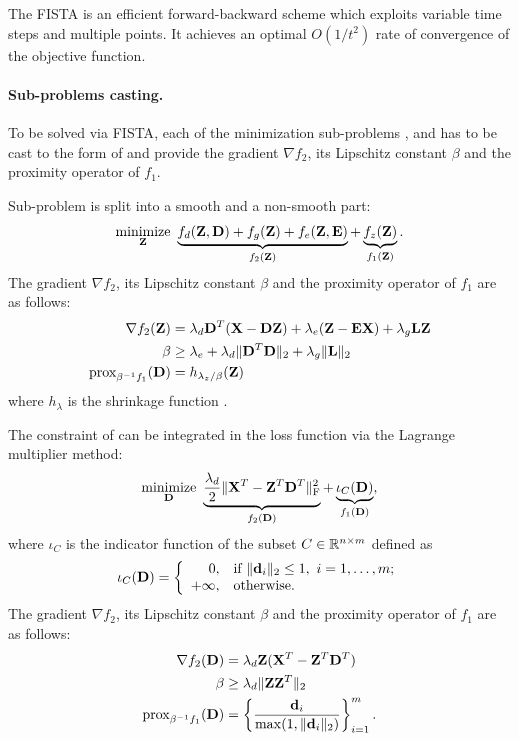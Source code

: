The \gls{FISTA} \cite{beck2009FISTA} is an efficient forward-backward scheme which exploits variable time steps and multiple points. It achieves an optimal \cite{nemirovsky1983optimalConvergence} $O(1/t^2)$ rate of convergence of the objective function.

\paragraph{Sub-problems casting.}
To be solved via \gls{FISTA}, each of the minimization sub-problems ,  and  has to be cast to the form of  and provide the gradient $\nabla f_2$, its Lipschitz constant $\beta$ and the proximity operator of $f_1$.

Sub-problem  is split into a smooth and a non-smooth part:
\begin{equation}
	\operatorname*{minimize}\limits_{\mathbf{Z}} \  \underbrace{f_d(\mathbf{Z}, \mathbf{D}) + f_g(\mathbf{Z}) + f_e(\mathbf{Z}, \mathbf{E})}_{f_2(\mathbf{Z})} + \underbrace{f_z(\mathbf{Z})}_{f_1(\mathbf{Z})}.
\end{equation}
The gradient $\nabla f_2$, its Lipschitz constant $\beta$ and the proximity operator of $f_1$ are as follows:
\begin{align}
	\nabla f_2(\mathbf{Z}) &= \lambda_d \mathbf{D}^T (\mathbf{X} - \mathbf{D} \mathbf{Z}) + \lambda_e (\mathbf{Z} - \mathbf{E} \mathbf{X}) + \lambda_g \mathbf{L} \mathbf{Z} \\
	\beta &\geq \lambda_e + \lambda_d \| \mathbf{D}^T \mathbf{D} \|_2 + \lambda_g \|\mathbf{L}\|_2 \\
	\text{prox}_{\beta^{-1} f_1}(\mathbf{D}) &= h_{\lambda_z / \beta} (\mathbf{Z})
\end{align}
where $h_\lambda$ is the shrinkage function .

The constraint of  can be integrated in the loss function via the Lagrange multiplier method:
\begin{equation}
	\operatorname*{minimize}\limits_{\mathbf{D}} \  \underbrace{\frac{\lambda_d}{2} \| \mathbf{X}^T - \mathbf{Z}^T\mathbf{D}^T \|_\text{F}^2}_{f_2(\mathbf{D})} + \underbrace{\iota_C(\mathbf{D})}_{f_1(\mathbf{D})},
\end{equation}
where $\iota_C$ is the indicator function of the subset $C \in \mathbb{R}^{n \times m}$ defined as
\begin{equation}
	\iota_C(\mathbf{D}) = \left\{ \begin{array}{rl}
	0, & \text{if } \|\mathbf{d}_i\|_2 \leq 1, \ i = 1, \ldots, m; \\
	+\infty, & \text{otherwise}.
	\end{array}\right.
\end{equation}
The gradient $\nabla f_2$, its Lipschitz constant $\beta$ and the proximity operator of $f_1$ are as follows:
\begin{align}
	\nabla f_2(\mathbf{D}) &= \lambda_d \mathbf{Z} (\mathbf{X}^T - \mathbf{Z}^T \mathbf{D}^T) \\
	\beta &\geq \lambda_d \| \mathbf{Z} \mathbf{Z}^T \|_2 \\
	\text{prox}_{\beta^{-1} f_1}(\mathbf{D}) &= \left\{ \frac{\mathbf{d}_i}{\max(1, \|\mathbf{d}_i\|_2)} \right\}_{i=1}^m.
\end{align}

